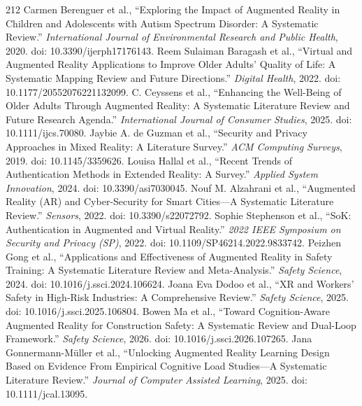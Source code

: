 \begin{thebibliography}{212}
 Carmen Berenguer et al., ``Exploring the Impact of Augmented Reality in Children and Adolescents with Autism Spectrum Disorder: A Systematic Review.'' \emph{International Journal of Environmental Research and Public Health}, 2020. doi: 10.3390/ijerph17176143.
 Reem Sulaiman Baragash et al., ``Virtual and Augmented Reality Applications to Improve Older Adults' Quality of Life: A Systematic Mapping Review and Future Directions.'' \emph{Digital Health}, 2022. doi: 10.1177/20552076221132099.
 C. Ceyssens et al., ``Enhancing the Well-Being of Older Adults Through Augmented Reality: A Systematic Literature Review and Future Research Agenda.'' \emph{International Journal of Consumer Studies}, 2025. doi: 10.1111/ijcs.70080.
 Jaybie A. de Guzman et al., ``Security and Privacy Approaches in Mixed Reality: A Literature Survey.'' \emph{ACM Computing Surveys}, 2019. doi: 10.1145/3359626.
 Louisa Hallal et al., ``Recent Trends of Authentication Methods in Extended Reality: A Survey.'' \emph{Applied System Innovation}, 2024. doi: 10.3390/asi7030045.
 Nouf M. Alzahrani et al., ``Augmented Reality ({AR}) and Cyber-Security for Smart Cities---A Systematic Literature Review.'' \emph{Sensors}, 2022. doi: 10.3390/s22072792.
 Sophie Stephenson et al., ``{SoK}: Authentication in Augmented and Virtual Reality.'' \emph{2022 IEEE Symposium on Security and Privacy (SP)}, 2022. doi: 10.1109/SP46214.2022.9833742.
 Peizhen Gong et al., ``Applications and Effectiveness of Augmented Reality in Safety Training: A Systematic Literature Review and Meta-Analysis.'' \emph{Safety Science}, 2024. doi: 10.1016/j.ssci.2024.106624.
 Joana Eva Dodoo et al., ``{XR} and Workers' Safety in High-Risk Industries: A Comprehensive Review.'' \emph{Safety Science}, 2025. doi: 10.1016/j.ssci.2025.106804.
 Bowen Ma et al., ``Toward Cognition-Aware Augmented Reality for Construction Safety: A Systematic Review and Dual-Loop Framework.'' \emph{Safety Science}, 2026. doi: 10.1016/j.ssci.2026.107265.
 Jana Gonnermann-M{\"u}ller et al., ``Unlocking Augmented Reality Learning Design Based on Evidence From Empirical Cognitive Load Studies---A Systematic Literature Review.'' \emph{Journal of Computer Assisted Learning}, 2025. doi: 10.1111/jcal.13095.

\end{thebibliography}
